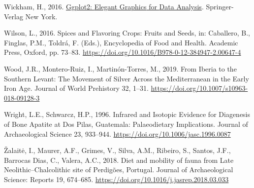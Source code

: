 \documentclass[3p]{elsarticle} %
\newlength{\cslhangindent}
\newlength{\cslentryspacingunit} %
\newenvironment{CSLReferences}[2] %
 {%
  \setlength{\parindent}{0pt}
  \ifodd #1
  \let\oldpar\par
  \def\par{\hangindent=\cslhangindent\oldpar}
  \fi
  \setlength{\parskip}{#2\cslentryspacingunit}
 }%
 {}
\begin{document}
\begin{CSLReferences}{1}{0}
\leavevmode{}%
Wickham, H., 2016. \href{https://ggplot2.tidyverse.org}{Ggplot2: {Elegant Graphics} for {Data Analysis}}. {Springer-Verlag New York}.

\leavevmode{}%
Wilson, L., 2016. Spices and {Flavoring Crops}: {Fruits} and {Seeds}, in: Caballero, B., Finglas, P.M., Toldrá, F. (Eds.), Encyclopedia of {Food} and {Health}. {Academic Press}, {Oxford}, pp. 73--83. \url{https://doi.org/10.1016/B978-0-12-384947-2.00647-4}

\leavevmode{}%
Wood, J.R., Montero-Ruiz, I., Martinón-Torres, M., 2019. From {Iberia} to the {Southern Levant}: {The Movement} of {Silver Across} the {Mediterranean} in the {Early Iron Age}. Journal of World Prehistory 32, 1--31. \url{https://doi.org/10.1007/s10963-018-09128-3}

\leavevmode{}%
Wright, L.E., Schwarcz, H.P., 1996. Infrared and {Isotopic Evidence} for {Diagenesis} of {Bone Apatite} at {Dos Pilas}, {Guatemala}: {Palaeodietary Implications}. Journal of Archaeological Science 23, 933--944. \url{https://doi.org/10.1006/jasc.1996.0087}

\leavevmode{}%
Žalaitė, I., Maurer, A.F., Grimes, V., Silva, A.M., Ribeiro, S., Santos, J.F., Barrocas Dias, C., Valera, A.C., 2018. Diet and mobility of fauna from {Late Neolithic}--{Chalcolithic} site of {Perdigões}, {Portugal}. Journal of Archaeological Science: Reports 19, 674--685. \url{https://doi.org/10.1016/j.jasrep.2018.03.033}

\end{CSLReferences}
\end{document}

